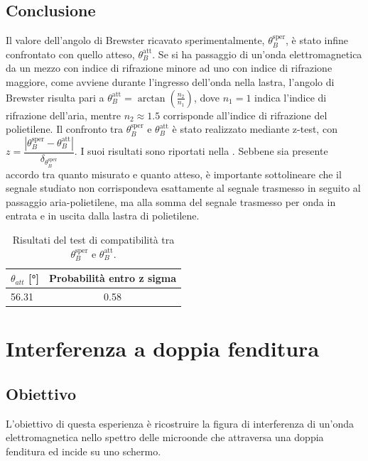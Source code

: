 \documentclass[a4paper]{article}
\begin{document}
\subsection{Conclusione}
Il valore dell'angolo di Brewster ricavato sperimentalmente, $\theta_B^{\text{sper}}$, è stato infine confrontato con quello atteso, $\theta_B^{\text{att}}$. Se si ha passaggio di un'onda elettromagnetica da un mezzo con indice di rifrazione minore ad uno con indice di rifrazione maggiore, come avviene durante l'ingresso dell'onda nella lastra, l'angolo di Brewster risulta pari a $\theta_B^{\text{att}} = \arctan\left(\frac{n_2}{n_1}\right)$, dove $n_1 = 1$ indica l'indice di rifrazione dell'aria, mentre $n_2 \approx 1.5$ corrisponde all'indice di rifrazione del polietilene. Il confronto tra $\theta_B^{\text{sper}}$ e $\theta_B^{\text{att}}$ è stato realizzato mediante z-test, con $z = \dfrac{|\theta_B^{\text{sper}} - \theta_B^{\text{att}}|}{\delta_{\theta_B^{\text{sper}}}}$. I suoi risultati sono riportati nella . Sebbene sia presente accordo tra quanto misurato e quanto atteso, è importante sottolineare che il segnale studiato non corrispondeva esattamente al segnale trasmesso in seguito al passaggio aria-polietilene, ma alla somma del segnale trasmesso per onda in entrata e in uscita dalla lastra di polietilene.
\begin{table}[htbp] 
\centering
\begin{tabular}{|l|c|}
\hline
$\theta_{att}$ [\si{\degree}] & Probabilità entro z sigma \\
\hline
56.31 & 0.58 \\
\bottomrule
\end{tabular}
\caption{Risultati del test di compatibilità tra $\theta_B^{\text{sper}}$ e $\theta_B^{\text{att}}$.}
\label{tab:brewster_compatibilita}
\end{table}


\section{Interferenza a doppia fenditura}
\subsection{Obiettivo}
L'obiettivo di questa esperienza è ricostruire la figura di interferenza di un'onda elettromagnetica nello spettro delle microonde che attraversa una doppia fenditura ed incide su uno schermo.
\end{document}
